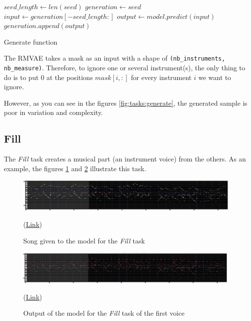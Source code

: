 \documentclass[12pt]{report}
\begin{document}
\begin{algorithm}
    \begin{algorithmic}[1]
        \Statex
            \State $seed\_length \gets len(seed)$
            \State $generation \gets seed$
                \State $input \gets generation[-seed\_length:]$
                \State $output \gets model.predict(input)$
                \State $generation.append(output)$
            \EndFor
            \State {}
        \EndFunction
        \end{algorithmic}
    \caption{Generate function}
    \label{alg:tasks:generate}
\end{algorithm}

The RMVAE takes a mask as an input with a shape of \texttt{(nb\_instruments, nb\_measure)}.
Therefore, to ignore one or several instrument(s), the only thing to do is to put $0$ at the positions $mask[i, :]$ for every instrument $i$ we want to ignore.

However, as you can see in the figures \ref{fig:tasks:generate}, the generated sample is poor in variation and complexity.

\subsection{Fill}
\label{sec:tasks:fill}

The \textit{Fill} task creates a musical part (an instrument voice) from the others.
As an example, the figures \ref{fig:tasks:fill:truth} and \ref{fig:tasks:fill:0} illustrate this task.

\begin{figure}[htbp]
    \centering
    \includegraphics[width=\textwidth]{images/generated_midis/tasks/fill/task-fill-truth.jpg}
    \caption{Song given to the model for the \textit{Fill} task}
    (\href{https://github.com/ValentinVignal/midiGenerator/blob/master/samples/tasks/fill_truth.mid}{Link})
    \label{fig:tasks:fill:truth}
\end{figure}

\begin{figure}[htbp]
    \centering
    \includegraphics[width=\textwidth]{images/generated_midis/tasks/fill/task-fill-0.jpg}
    \caption{Output of the model for the \textit{Fill} task of the first voice}
    (\href{https://github.com/ValentinVignal/midiGenerator/blob/master/samples/tasks/fill_1.mid}{Link})
    \label{fig:tasks:fill:0}
\end{figure}
\end{document}
